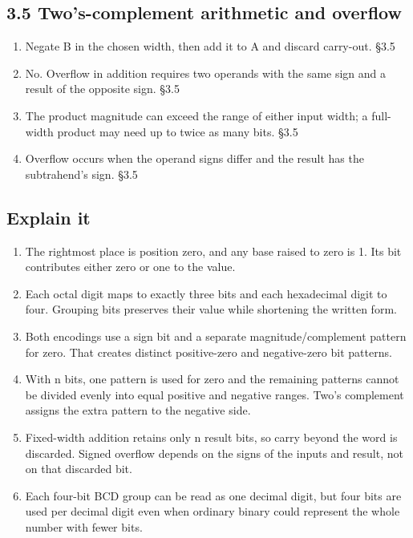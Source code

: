 \documentclass[11pt]{article}
\begin{document}
\begin{keepsection}\subsection{3.5 Two’s-complement arithmetic and overflow}

\begin{enumerate}
\item Negate B in the chosen width, then add it to A and discard carry-out. \hfill{\small\color{FAUblue}§3.5}
\item No. Overflow in addition requires two operands with the same sign and a result of the opposite sign. \hfill{\small\color{FAUblue}§3.5}
\item The product magnitude can exceed the range of either input width; a full-width product may need up to twice as many bits. \hfill{\small\color{FAUblue}§3.5}
\item Overflow occurs when the operand signs differ and the result has the subtrahend’s sign. \hfill{\small\color{FAUblue}§3.5}
\end{enumerate}

\end{keepsection}
\begin{keepsection}\subsection{Explain it}

\begin{enumerate}
\item The rightmost place is position zero, and any base raised to zero is 1. Its bit contributes either zero or one to the value.
\item Each octal digit maps to exactly three bits and each hexadecimal digit to four. Grouping bits preserves their value while shortening the written form.
\item Both encodings use a sign bit and a separate magnitude/complement pattern for zero. That creates distinct positive-zero and negative-zero bit patterns.
\item With n bits, one pattern is used for zero and the remaining patterns cannot be divided evenly into equal positive and negative ranges. Two’s complement assigns the extra pattern to the negative side.
\item Fixed-width addition retains only n result bits, so carry beyond the word is discarded. Signed overflow depends on the signs of the inputs and result, not on that discarded bit.
\item Each four-bit BCD group can be read as one decimal digit, but four bits are used per decimal digit even when ordinary binary could represent the whole number with fewer bits.
\end{enumerate}

\end{keepsection}
\end{document}
